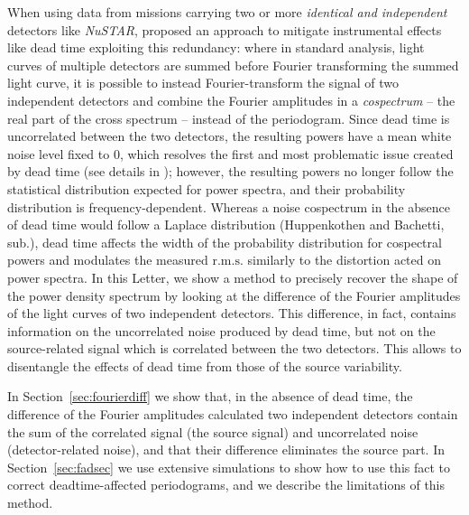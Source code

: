 \documentclass[twocolumn]{aastex61}
\newcommand{\project}[1]{\textsl{#1}}
\newcommand{\nustar}{\project{NuSTAR}\xspace}
\newcommand{\sref}{Section~\ref}
\newcommand{\rms}{\ensuremath{\mathrm{r.m.s.}}\xspace}
\begin{document}
When using data from missions carrying two or more \textit{identical and independent} detectors like \nustar, \citet{Bachetti+15} proposed an approach to mitigate instrumental effects like dead time exploiting this redundancy: 
where in standard analysis, light curves of multiple detectors are summed before Fourier transforming the summed light curve, 
it is possible to instead Fourier-transform the signal of two independent detectors and combine the Fourier amplitudes in a \textit{cospectrum} -- the real part of the cross spectrum -- instead of the periodogram. 
Since dead time is uncorrelated between the two detectors, the resulting powers have a mean white noise level fixed to 0, which resolves the first and most problematic issue created by dead time (see details in \citealt{Bachetti+15}); however, the resulting powers no longer follow the statistical distribution expected for power spectra, and their probability distribution is frequency-dependent.
Whereas a noise cospectrum in the absence of dead time would follow a Laplace distribution (Huppenkothen and Bachetti, sub.),
dead time affects the width of the probability distribution for cospectral powers and modulates the measured \rms similarly to the distortion acted on power spectra.
In this Letter, we show a method to precisely recover the shape of the power density spectrum by looking at the difference of the Fourier amplitudes of the light curves of two independent detectors.
This difference, in fact, contains information on the uncorrelated noise produced by dead time, but not on the source-related  signal which is correlated between the two detectors.
This allows to disentangle the effects of dead time from those of the source variability.

In \sref{sec:fourierdiff} we show that, in the absence of dead time, the difference of the Fourier amplitudes calculated  two independent detectors contain the sum of the correlated signal (the source signal) and uncorrelated noise (detector-related noise), and that their difference eliminates the source part. 
In \sref{sec:fadsec} we use extensive simulations to show how to use this fact to correct deadtime-affected periodograms, and we describe the limitations of this method.

\end{document}
